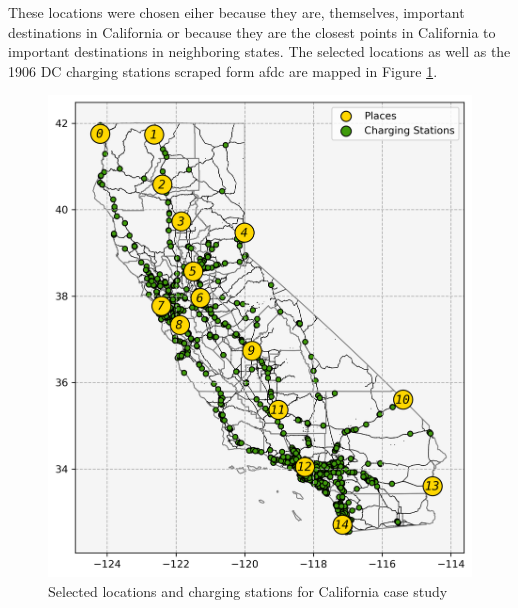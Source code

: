 \documentclass[11pt]{article}
\begin{document}
\begin{multicols}{2}
These locations were chosen eiher because they are, themselves, important destinations in California or because they are the closest points in California to important destinations in neighboring states. The selected locations as well as the 1906 DC charging stations scraped form \gls{afdc} \cite{afdc_2023} are mapped in Figure \ref{fig:california_atlas}.

\begin{figure}[H]
	\centering
	\includegraphics[width = \linewidth]{figs/California_Places_Chargers.png}
	\caption{Selected locations and charging stations for California case study}
	\label{fig:california_atlas}
\end{figure}

%
%

\newpage

\printbibliography

\end{multicols}
\end{document}
